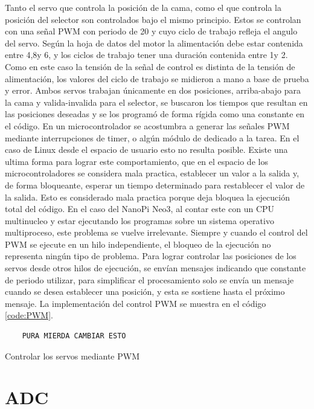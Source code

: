 \documentclass[12pt,letterpaper]{article}     %
\begin{document}
Tanto el servo que controla la posición de la cama, como el que controla la posición del selector
son controlados bajo el mismo principio. Estos se controlan con una señal PWM con periodo de 20\milli\second
y cuyo ciclo de trabajo refleja el angulo del servo. Según la hoja de datos del motor la alimentación debe
estar contenida entre 4,8\volt y 6\volt, y los ciclos de trabajo tener una duración contenida entre 
1\milli\second y 2\milli\second. Como en este caso la tensión de la señal de control es distinta de la
tensión de alimentación, los valores del ciclo de trabajo se midieron a mano a base de prueba y error. 
Ambos servos trabajan únicamente en dos posiciones, arriba-abajo para la cama y valida-invalida para el 
selector, se buscaron los tiempos que resultan en las posiciones deseadas y se los programó de forma rígida
como una constante en el código.
En un microcontrolador se acostumbra a generar las señales PWM mediante interrupciones de timer, o algún
módulo de dedicado a la tarea. En el caso de Linux desde el espacio de usuario esto no resulta posible.
Existe una ultima forma para lograr este comportamiento, que en el espacio de los microcontroladores
se considera mala practica, establecer un valor a la salida y, de forma bloqueante, esperar un tiempo
determinado para restablecer el valor de la salida. Esto es considerado mala practica porque deja bloquea
la ejecución total del código. En el caso del NanoPi Neo3, al contar este con un CPU multinucleo y estar
ejecutando los programas sobre un sistema operativo multiproceso, este problema se vuelve irrelevante.
Siempre y cuando el control del PWM se ejecute en un hilo independiente, el bloqueo de la ejecución no
representa ningún tipo de problema. Para lograr controlar las posiciones de los servos desde otros hilos 
de ejecución, se envían mensajes indicando que constante de periodo utilizar, para simplificar el procesamiento
solo se envía un mensaje cuando se desea establecer una posición, y esta se sostiene hasta el próximo mensaje.
La implementación del control PWM se muestra en el código \ref{code:PWM}.

\begin{codigo}[!h]
	\begin{lstlisting}
	PURA MIERDA CAMBIAR ESTO
	\end{lstlisting}
	\caption{Controlar los servos mediante PWM}
	\label{code:PWM}
\end{codigo}

\section{ADC}
\end{document}
